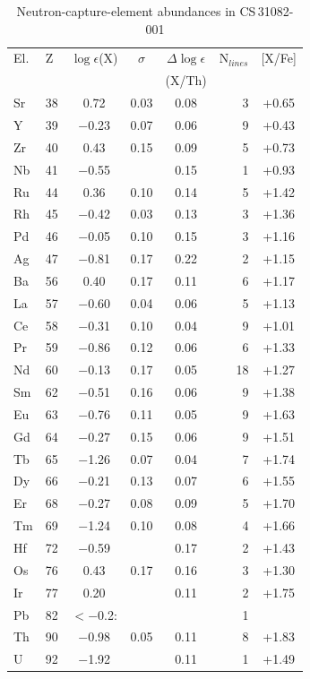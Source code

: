 \documentclass{aa}
\begin{document}
\begin{table}[htbp]
\begin{center}
\caption{Neutron-capture-element abundances in CS\,31082-001
\label{T-heavy} }
\begin{tabular}{llcccrc}
\hline
El.& Z   &$\log \epsilon$(X)& $\sigma$& $\Delta \log \epsilon$
&N$_{lines}$ & [X/Fe]\\
   &     &                  &         & (X/Th) \\
Sr &38   & 0.72   &0.03   &  0.08 & 3 & +0.65\\ 
 Y &39   &$-$0.23   &0.07   &  0.06 & 9 & +0.43\\ 
Zr &40   & 0.43   &0.15   &  0.09 & 5 & +0.73\\ 
Nb &41   &$-$0.55   &       &  0.15 & 1 & +0.93\\ 
Ru &44   & 0.36   &0.10   &  0.14 & 5 & +1.42\\ 
Rh &45   &$-$0.42   &0.03   &  0.13 & 3 & +1.36\\ 
Pd &46   &$-$0.05   &0.10   &  0.15 & 3 & +1.16\\ 
Ag &47   &$-$0.81   &0.17   &  0.22 & 2 & +1.15\\ 
Ba &56   & 0.40   &0.17   &  0.11 & 6 & +1.17\\ 
La &57   &$-$0.60   &0.04   &  0.06 & 5 & +1.13\\ 
Ce &58   &$-$0.31   &0.10   &  0.04 & 9 & +1.01\\ 
Pr &59   &$-$0.86   &0.12   &  0.06 & 6 & +1.33\\ 
Nd &60   &$-$0.13   &0.17   &  0.05 &18 & +1.27\\ 
Sm &62   &$-$0.51   &0.16   &  0.06 & 9 & +1.38\\ 
Eu &63   &$-$0.76   &0.11   &  0.05 & 9 & +1.63\\ 
Gd &64   &$-$0.27   &0.15   &  0.06 & 9 & +1.51\\ 
Tb &65   &$-$1.26   &0.07   &  0.04 & 7 & +1.74\\ 
Dy &66   &$-$0.21   &0.13   &  0.07 & 6 & +1.55\\ 
Er &68   &$-$0.27   &0.08   &  0.09 & 5 & +1.70\\ 
Tm &69   &$-$1.24   &0.10   &  0.08 & 4 & +1.66\\ 
Hf &72   &$-$0.59   &       &  0.17 & 2 & +1.43\\ 
Os &76   & 0.43   &0.17   &  0.16 & 3 & +1.30\\ 
Ir &77   & 0.20   &       &  0.11 & 2 & +1.75\\ 
Pb &82   &$<-$0.2:&       &       & 1 & \\
Th &90   &$-$0.98   &0.05   &  0.11 & 8 & +1.83\\ 
 U &92   &$-$1.92   &       &  0.11 & 1 & +1.49\\ 
\hline \hline 
\end{tabular}
\end{center}
\end{table}
\end{document}
